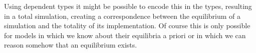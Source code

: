 \begin{itemize}
	Using dependent types it might be possible to encode this in the types, resulting in a total simulation, creating a correspondence between the equilibrium of a simulation and the totality of its implementation. Of course this is only possible for models in which we know about their equilibria a priori or in which we can reason somehow that an equilibrium exists.
\end{itemize}
